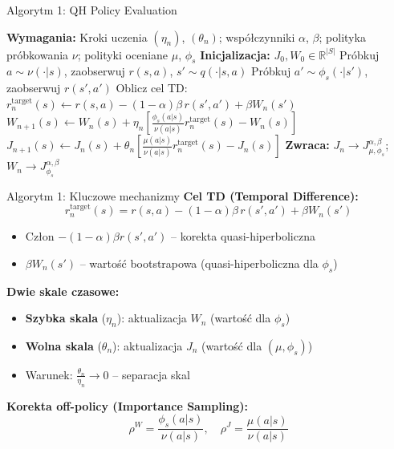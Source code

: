 \begin{frame}{Algorytm 1: QH Policy Evaluation}
\begin{algorithm}[H]
\caption{Ocena polityki dla dyskontowania QH \cite{eshwar2025}}
\label{alg:policy-eval-defense}
\begin{algorithmic}[1]
\small
\STATE \textbf{Wymagania:} Kroki uczenia $(\eta_n)$, $(\theta_n)$; współczynniki $\alpha$, $\beta$; polityka próbkowania $\nu$; polityki oceniane $\mu$, $\phi_s$
\STATE \textbf{Inicjalizacja:} $J_0, W_0 \in \mathbb{R}^{|S|}$
\STATE Próbkuj $a \sim \nu(\cdot|s)$, zaobserwuj $r(s, a)$, $s' \sim q(\cdot|s, a)$
\STATE Próbkuj $a' \sim \phi_s(\cdot|s')$, zaobserwuj $r(s', a')$
\STATE Oblicz cel TD: $r^{\text{target}}_n(s) \leftarrow r(s, a) - (1 - \alpha)\beta \, r(s', a') + \beta W_n(s')$
\STATE $W_{n+1}(s) \leftarrow W_n(s) + \eta_n \left[ \frac{\phi_s(a|s)}{\nu(a|s)} r^{\text{target}}_n(s) - W_n(s) \right]$
\STATE $J_{n+1}(s) \leftarrow J_n(s) + \theta_n \left[ \frac{\mu(a|s)}{\nu(a|s)} r^{\text{target}}_n(s) - J_n(s) \right]$
\ENDFOR
\ENDFOR
\STATE \textbf{Zwraca:} $J_n \to J^{\alpha, \beta}_{\mu, \phi_s}$; $W_n \to J^{\alpha, \beta}_{\phi_s}$
\end{algorithmic}
\end{algorithm}
\end{frame}

\begin{frame}{Algorytm 1: Kluczowe mechanizmy}
\textbf{Cel TD (Temporal Difference):}
\[
r^{\text{target}}_n(s) = r(s,a) - (1-\alpha)\beta \, r(s',a') + \beta W_n(s')
\]

\begin{itemize}
    \item Człon $-(1-\alpha)\beta r(s',a')$ -- korekta quasi-hiperboliczna
    \item $\beta W_n(s')$ -- wartość bootstrapowa (quasi-hiperboliczna dla $\phi_s$)
\end{itemize}

\vspace{0.5em}
\textbf{Dwie skale czasowe:}
\begin{itemize}
    \item \textbf{Szybka skala} ($\eta_n$): aktualizacja $W_n$ (wartość dla $\phi_s$)
    \item \textbf{Wolna skala} ($\theta_n$): aktualizacja $J_n$ (wartość dla $(\mu, \phi_s)$)
    \item Warunek: $\frac{\theta_n}{\eta_n} \to 0$ -- separacja skal
\end{itemize}

\vspace{0.5em}
\textbf{Korekta off-policy (Importance Sampling):}
\[
\rho^W = \frac{\phi_s(a|s)}{\nu(a|s)}, \quad \rho^J = \frac{\mu(a|s)}{\nu(a|s)}
\]
\end{frame}

